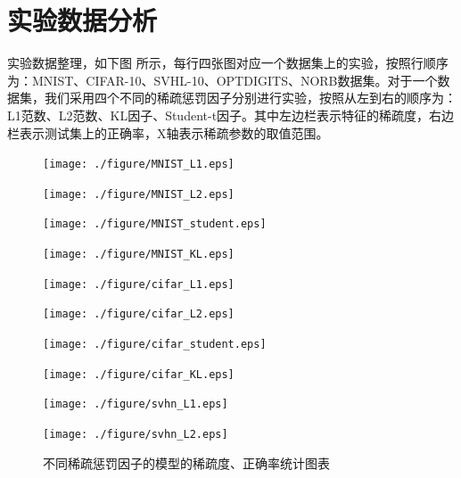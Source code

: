 \documentclass[oneside]{ZJUthesis}
\begin{document}
\section{实验数据分析}
实验数据整理，如下图\label{fig:sparsitylevel} 所示，每行四张图对应一个数据集上的实验，按照行顺序为：MNIST、CIFAR-10、SVHL-10、OPTDIGITS、NORB数据集。对于一个数据集，我们采用四个不同的稀疏惩罚因子分别进行实验，按照从左到右的顺序为：L1范数、L2范数、KL因子、Student-t因子。其中左边栏表示特征的稀疏度，右边栏表示测试集上的正确率，X轴表示稀疏参数的取值范围。
\begin{figure}[h]	  
\caption{不同稀疏惩罚因子的模型的稀疏度、正确率统计图表\label{fig:sparsitylevel}}
\begin{minipage}[h]{0.23\linewidth}
\centering
\texttt{[image: ./figure/MNIST\_L1.eps]}
\end{minipage}
\hfill
\begin{minipage}[h]{0.23\linewidth}
\centering
\texttt{[image: ./figure/MNIST\_L2.eps]}
\end{minipage}
\hfill
\begin{minipage}[h]{0.23\linewidth}
\centering
\texttt{[image: ./figure/MNIST\_student.eps]}
\end{minipage}
\hfill
\begin{minipage}[h]{0.23\linewidth}
\centering
\texttt{[image: ./figure/MNIST\_KL.eps]}
\end{minipage}
\hfill
\begin{minipage}[h]{0.23\linewidth}
\centering
\texttt{[image: ./figure/cifar\_L1.eps]}
\end{minipage}
\hfill
\begin{minipage}[h]{0.23\linewidth}
\centering
\texttt{[image: ./figure/cifar\_L2.eps]}
\end{minipage}
\hfill
\begin{minipage}[h]{0.23\linewidth}
\centering
\texttt{[image: ./figure/cifar\_student.eps]}
\end{minipage}
\hfill
\begin{minipage}[h]{0.23\linewidth}
\centering
\texttt{[image: ./figure/cifar\_KL.eps]}
\end{minipage}
\hfill
\begin{minipage}[h]{0.24\linewidth}
\centering
\texttt{[image: ./figure/svhn\_L1.eps]}
\end{minipage}
\hfill
\begin{minipage}[h]{0.24\linewidth}
\centering
\texttt{[image: ./figure/svhn\_L2.eps]}
\end{minipage}
\hfill
\begin{minipage}[h]{0.24\linewidth}

\end{minipage}
\end{figure}
\end{document}

